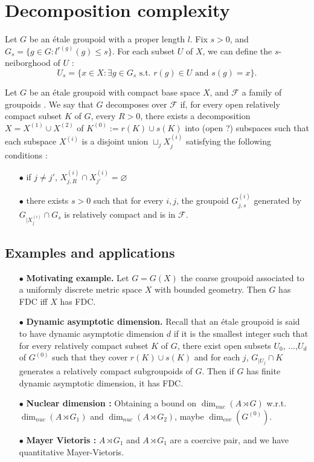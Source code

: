 \section{Decomposition complexity}

Let $G$ be an étale groupoid with a proper length $l$. Fix $s>0$, and $G_s=\{g\in G : l^{r(g)}(g)\leq s\}$. For each subset $U$ of $X$, we can define the $s$-neiborghood of $U$ :
\[U_s = \{x\in X : \exists g\in G_s \text{ s.t. } r(g)\in U \text{ and } s(g)=x \}.\]

\begin{definition}
Let $G$ be an étale groupoid with compact base space $X$, and $\mathcal F$ a family of groupoids . We say that $G$ decomposes over $\mathcal F$ if, for every open relatively compact subset $K$ of $G$, every $R>0$, there exists a decomposition $X=X^{(1)}\cup X^{(2)}$ of $K^{(0)}:= r(K)\cup s(K)$ into (open ?) subspaces such that each subspace $X^{(i)}$ is a disjoint union $\sqcup_j X^{(i)}_j$ satisfying the following conditions :
\begin{itemize}
\item[$\bullet$] if $j\neq j'$,  $X^{(i)}_{j,R}\cap X^{(i)}_{j'}=\varnothing$
\item[$\bullet$] there exists $s>0$ such that for every $i,j$, the groupoid $G_{j,s}^{(i)}$ generated by $G_{|X^{(i)}_j}\cap G_s$ is relatively compact and is in $\mathcal F$.
\end{itemize}
\end{definition}

\subsection{Examples and applications}

\begin{itemize}
\item[$\bullet$] \textbf{Motivating example.} Let $G=G(X)$ the coarse groupoid associated to a uniformly discrete metric space $X$ with bounded geometry. Then $G$ has FDC iff $X$ has FDC.\\
\item[$\bullet$] \textbf{Dynamic asymptotic dimension.} Recall that an étale groupoid is said to have dynamic asymptotic dimension $d$ if it is the smallest integer such that for every relatively compact subset $K$ of $G$, there exist open subsets $U_0$, ...,$U_d$ of $G^{(0)}$ such that they cover $r(K)\cup s(K)$ and for each $j$, $G_{|U_j}\cap K$ generates a relatively compact subgroupoids of $G$. Then if $G$ has finite dynamic asymptotic dimension, it has FDC. 

\item[$\bullet$] \textbf{Nuclear dimension :} Obtaining a bound on $\dim_{nuc}(A\rtimes G)$ w.r.t. $\dim_{nuc} (A\rtimes G_1)$ and $\dim_{nuc} (A\rtimes G_2)$, maybe $\dim_{cov}(G^{(0)})$.
\item[$\bullet$] \textbf{Mayer Vietoris :} $A\rtimes G_1$ and $A\rtimes G_1$ are a coercive pair, and we have quantitative Mayer-Vietoris. 
\end{itemize}




